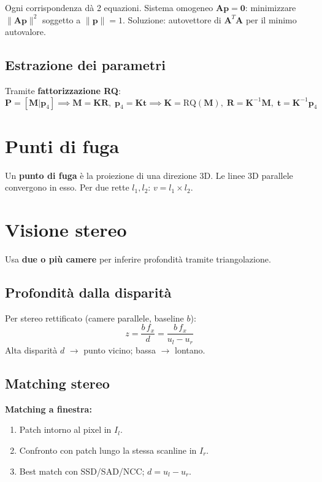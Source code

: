 \documentclass[12pt, a4paper]{report}
\begin{document}
Ogni corrispondenza dà 2 equazioni. Sistema omogeneo $\mathbf{Ap}=\mathbf{0}$:
minimizzare $\|\mathbf{Ap}\|^2$ soggetto a $\|\mathbf{p}\|=1$.
Soluzione: autovettore di $\mathbf{A}^T\mathbf{A}$ per il minimo autovalore.

\subsection{Estrazione dei parametri}

Tramite \textbf{fattorizzazione RQ}:
\[
  \mathbf{P}=[\mathbf{M}|\mathbf{p}_4]\implies
  \mathbf{M}=\mathbf{KR},\;\mathbf{p}_4=\mathbf{Kt}\implies
  \mathbf{K}=\mathrm{RQ}(\mathbf{M}),\;
  \mathbf{R}=\mathbf{K}^{-1}\mathbf{M},\;
  \mathbf{t}=\mathbf{K}^{-1}\mathbf{p}_4
\]

\section{Punti di fuga}

Un \textbf{punto di fuga} è la proiezione di una direzione 3D. Le linee 3D
parallele convergono in esso. Per due rette $l_1,l_2$: $v=l_1\times l_2$.

\section{Visione stereo}

Usa \textbf{due o più camere} per inferire profondità tramite triangolazione.

\subsection{Profondità dalla disparità}

Per stereo rettificato (camere parallele, baseline $b$):
\[
  z=\frac{b\,f_x}{d}=\frac{b\,f_x}{u_l-u_r}
\]
Alta disparità $d$ $\to$ punto vicino; bassa $\to$ lontano.

\subsection{Matching stereo}

\textbf{Matching a finestra:}
\begin{enumerate}
  \item Patch intorno al pixel in $I_l$.
  \item Confronto con patch lungo la stessa scanline in $I_r$.
  \item Best match con SSD/SAD/NCC; $d=u_l-u_r$.
\end{enumerate}
\end{document}
